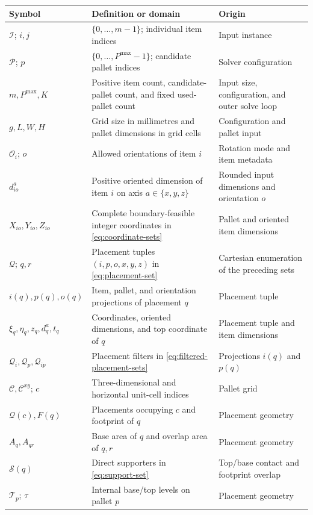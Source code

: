 \documentclass[11pt]{article}
\newcommand{\Item}{\mathcal{I}}
\newcommand{\Pallet}{\mathcal{P}}
\newcommand{\Place}{\mathcal{Q}}
\newcommand{\Cell}{\mathcal{C}}
\newcommand{\Support}{\mathcal{S}}
\begin{document}
\begin{table}[ht]
\centering
\footnotesize
\begin{tabularx}{\linewidth}{@{}lXX@{}}
\toprule
Symbol & Definition or domain & Origin \\
\midrule
$\Item$; $i,j$ & $\{0,\ldots,m-1\}$; individual item indices & Input instance \\
$\Pallet$; $p$ & $\{0,\ldots,P^{\max}-1\}$; candidate pallet indices & Solver configuration \\
$m,P^{\max},K$ & Positive item count, candidate-pallet count, and fixed used-pallet count & Input size, configuration, and outer solve loop \\
$g,L,W,H$ & Grid size in millimetres and pallet dimensions in grid cells & Configuration and pallet input \\
$\mathcal O_i$; $o$ & Allowed orientations of item $i$ & Rotation mode and item metadata \\
$d_{io}^a$ & Positive oriented dimension of item $i$ on axis $a\in\{x,y,z\}$ & Rounded input dimensions and orientation $o$ \\
$X_{io},Y_{io},Z_{io}$ & Complete boundary-feasible integer coordinates in \eqref{eq:coordinate-sets} & Pallet and oriented item dimensions \\
$\Place$; $q,r$ & Placement tuples $(i,p,o,x,y,z)$ in \eqref{eq:placement-set} & Cartesian enumeration of the preceding sets \\
$i(q),p(q),o(q)$ & Item, pallet, and orientation projections of placement $q$ & Placement tuple \\
$\xi_q,\eta_q,z_q,d_q^a,t_q$ & Coordinates, oriented dimensions, and top coordinate of $q$ & Placement tuple and item dimensions \\
$\Place_i,\Place_p,\Place_{ip}$ & Placement filters in \eqref{eq:filtered-placement-sets} & Projections $i(q)$ and $p(q)$ \\
$\Cell,\Cell^{xy}$; $c$ & Three-dimensional and horizontal unit-cell indices & Pallet grid \\
$\Place(c),F(q)$ & Placements occupying $c$ and footprint of $q$ & Placement geometry \\
$A_q,A_{qr}$ & Base area of $q$ and overlap area of $q,r$ & Placement geometry \\
$\Support(q)$ & Direct supporters in \eqref{eq:support-set} & Top/base contact and footprint overlap \\
$\mathcal T_p$; $\tau$ & Internal base/top levels on pallet $p$ & Placement geometry \\

\end{tabularx}
\end{table}
\end{document}
